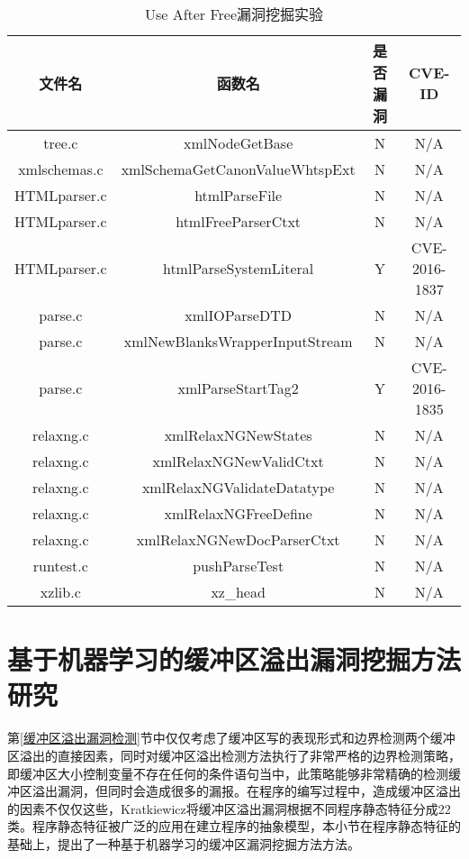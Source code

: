 {\begin{table}[ht]
\begin{center}
\caption{Use After Free漏洞挖掘实验} \label{use after free漏洞挖掘实验}
\begin{small}
\begin{tabular}{cccc}
\hline 
文件名 & 函数名 & 是否漏洞 & CVE-ID\tabularnewline
\hline 
tree.c & xmlNodeGetBase & N & N/A\tabularnewline
xmlschemas.c & xmlSchemaGetCanonValueWhtspExt & N & N/A\tabularnewline
HTMLparser.c & htmlParseFile & N & N/A\tabularnewline
HTMLparser.c & htmlFreeParserCtxt & N & N/A\tabularnewline
HTMLparser.c & htmlParseSystemLiteral & Y & CVE-2016-1837\tabularnewline
parse.c & xmlIOParseDTD & N & N/A\tabularnewline
parse.c & xmlNewBlanksWrapperInputStream & N & N/A\tabularnewline
parse.c & xmlParseStartTag2 & Y & CVE-2016-1835\tabularnewline
relaxng.c & xmlRelaxNGNewStates & N & N/A\tabularnewline
relaxng.c & xmlRelaxNGNewValidCtxt & N & N/A\tabularnewline
relaxng.c & xmlRelaxNGValidateDatatype & N & N/A\tabularnewline
relaxng.c & xmlRelaxNGFreeDefine & N & N/A\tabularnewline
relaxng.c & xmlRelaxNGNewDocParserCtxt & N & N/A\tabularnewline
runtest.c & pushParseTest & N & N/A\tabularnewline
xzlib.c & xz\_head & N & N/A\tabularnewline
\hline 
\end{tabular}
\end{small}
\end{center}
\end{table}


\section{基于机器学习的缓冲区溢出漏洞挖掘方法研究}
\label{基于机器学习的缓冲区溢出漏洞挖掘方法研究}

第\ref{缓冲区溢出漏洞检测}节中仅仅考虑了缓冲区写的表现形式和边界检测两个缓冲区溢出的直接因素，同时对缓冲区溢出检测方法执行了非常严格的边界检测策略，即缓冲区大小控制变量不存在任何的条件语句当中，此策略能够非常精确的检测缓冲区溢出漏洞，但同时会造成很多的漏报。在程序的编写过程中，造成缓冲区溢出的因素不仅仅这些，Kratkiewicz将缓冲区溢出漏洞根据不同程序静态特征分成22类。程序静态特征被广泛的应用在建立程序的抽象模型，本小节在程序静态特征的基础上，提出了一种基于机器学习的缓冲区漏洞挖掘方法方法。

}
